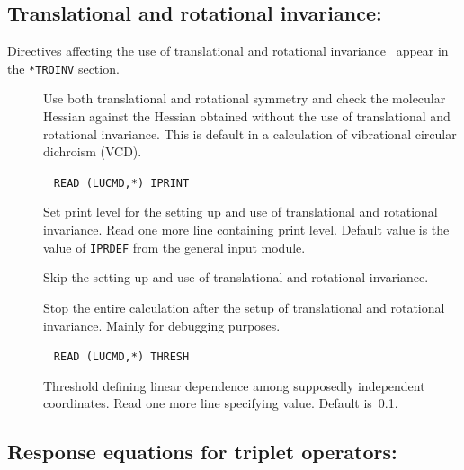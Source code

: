 \subsection{Translational and rotational invariance: 
}\label{sec:abatro}

Directives affecting the use of translational and rotational
invariance~\cite{trarot}
appear in the \verb|*TROINV| section.
\begin{description}
\item[] Use both translational and
 rotational symmetry 
 and check the molecular Hessian against the Hessian obtained
without the use of translational and rotational invariance. This is
default in a calculation of vibrational circular dichroism
(VCD).

\item[]\verb| |\newline
\verb|READ (LUCMD,*) IPRINT|

Set print level for the setting up and use of translational and
rotational invariance.  Read one more line containing print
level. Default value is the value of \verb|IPRDEF| from the
general input module.

\item[] Skip the setting up and use of translational
and rotational invariance.

\item[] Stop the entire calculation after the setup of
translational and rotational invariance. Mainly for debugging purposes.

\item[]\verb| |\newline
\verb|READ (LUCMD,*) THRESH|

Threshold defining linear dependence among
supposedly independent coordinates.  Read one more line specifying
value.  Default is~0.1.
\end{description}

\subsection{Response equations for triplet operators:
}\label{sec:trprsp}

